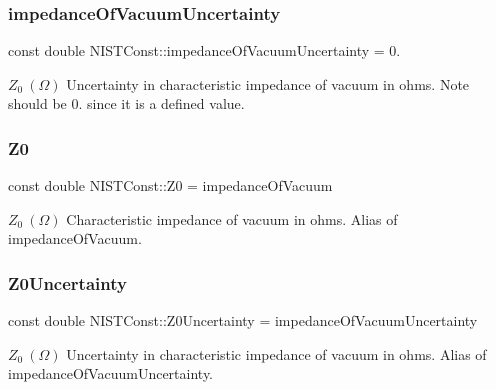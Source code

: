 \subsubsection{\texorpdfstring{impedance\+Of\+Vacuum\+Uncertainty}{impedanceOfVacuumUncertainty}}
{\footnotesize\ttfamily const double N\+I\+S\+T\+Const\+::impedance\+Of\+Vacuum\+Uncertainty = 0.}

$Z_0 \ (\Omega)$ Uncertainty in characteristic impedance of vacuum in ohms. Note should be 0. since it is a defined value. \mbox{\label{group___impedance_of_vacuum_ga0de5c47b3a38d72c61aac5574ea154ca}} 
\subsubsection{\texorpdfstring{Z0}{Z0}}
{\footnotesize\ttfamily const double N\+I\+S\+T\+Const\+::\+Z0 = impedance\+Of\+Vacuum}

$Z_0 \ (\Omega)$ Characteristic impedance of vacuum in ohms. Alias of impedance\+Of\+Vacuum. \mbox{\label{group___impedance_of_vacuum_gaa511043a811bd20587a1903b52aa6dc7}} 
\subsubsection{\texorpdfstring{Z0\+Uncertainty}{Z0Uncertainty}}
{\footnotesize\ttfamily const double N\+I\+S\+T\+Const\+::\+Z0\+Uncertainty = impedance\+Of\+Vacuum\+Uncertainty}

$Z_0 \ (\Omega)$ Uncertainty in characteristic impedance of vacuum in ohms. Alias of impedance\+Of\+Vacuum\+Uncertainty. 